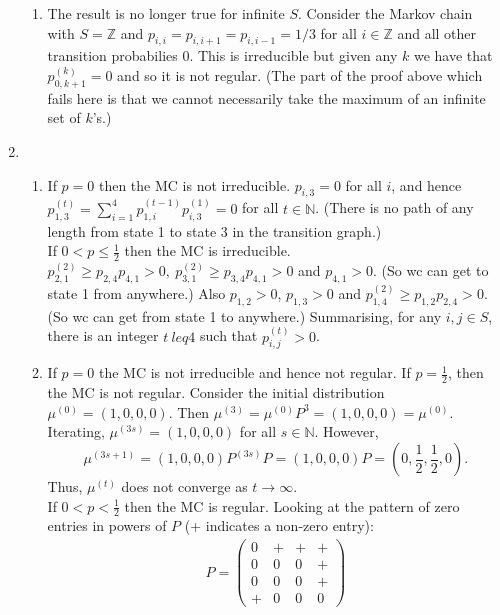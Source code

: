 \documentclass[11pt,a4paper]{article}
\begin{document}
\begin{enumerate}
\begin{enumerate}
            \item The result is no longer true for infinite $S$. Consider the Markov chain with $S = \mathbb{Z}$ and $p_{i,i} = p_{i,i+1}=p_{i,i-1}=1/3$ for all $i\in \mathbb{Z}$ and all other transition probabilies $0$. This is irreducible but given any $k$ we have that $p_{0,k+1}^{(k)} = 0$ and so it is not regular. (The part of the proof above which fails here is that we cannot necessarily take the maximum of an infinite set of $k$'s.)
        \end{enumerate}
        \item 
        \begin{enumerate}
            \item If $p = 0$ then the MC is not irreducible. $p_{i,3} = 0$ for all $i$, and hence $p_{1,3}^{(t)} = \sum_{i=1}^4p_{1,i}^{(t-1)}p_{i,3}^{(1)} = 0$ for all $t \in \mathbb{N}$. (There is no path of any length from state 1 to state 3 in the transition graph.)\\
            If $0 < p \leq \frac{1}{2}$ then the MC is irreducible. $p_{2,1}^{(2)} \geq p_{2,4}p_{4,1}>0,\ p_{3,1}^{(2)} \geq p_{3,4}p_{4,1} > 0$ and $p_{4,1} > 0$. (So wc can get to state 1 from anywhere.) Also $p_{1,2} > 0$, $p_{1,3} > 0$ and $p_{1,4}^{(2)} \geq p_{1,2}p_{2,4} > 0$. (So wc can get from state 1 to anywhere.) Summarising, for any $i,j \in S$, there is an integer $t \ leq 4$ such that $p_{i,j}^{(t)} > 0$.
            \item If $p = 0$ the MC is not irreducible and hence not regular. If $p = \frac{1}{2}$, then the MC is not regular. Consider the initial distribution $\mu^{(0)} = (1, 0, 0, 0)$. Then $\mu^{(3)}= \mu^{(0)}P^3 = (1,0,0,0) = \mu^{(0)}$. Iterating, $\mu^{(3s)} = (1,0,0,0)$ for all $s \in \mathbb{N}$. However,
            $$
            \mu^{(3s+1)} = (1,0,0,0)P^{(3s)}P = (1,0,0,0)P = (0,\frac{1}{2},\frac{1}{2},0).
            $$
            Thus, $\mu^{(t)}$ does not converge as $t \to \infty$.\\
            If $0 < p < \frac{1}{2}$ then the MC is regular. Looking at the pattern of zero entries in powers of $P$ (+ indicates a non-zero entry):
            \begin{align*}
                P
                =
                \begin{pmatrix}
                    0 & + & + & + \\
                    0 & 0 & 0 & + \\
                    0 & 0 & 0 & + \\
                    + & 0 & 0 & 0 

\end{pmatrix}
\end{align*}
\end{enumerate}
\end{enumerate}
\end{document}

